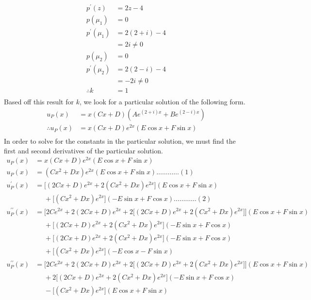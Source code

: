 \documentclass[a4paper]{article}
\newcommand{\ds}{\displaystyle}
\begin{document}
\begin{enumerate}
\begin{align*}
		p^{\prime}(z) & = 2z - 4\\
		p(\mu_1) & = 0\\
		p^{\prime}(\mu_1) & = 2(2+i) - 4\\
		& = 2i \neq 0\\
		p(\mu_2) & = 0\\
		p^{\prime}(\mu_2) & = 2(2-i) - 4\\
		& = -2i \neq 0\\
		\therefore k & = 1\\
	\end{align*}
	Based off this result for $\ds{k}$, we look for a particular solution of the following form.
	\begin{align*}
		u_P(x) & = x(Cx + D)(Ae^{(2+i)x} + Be^{(2-i)x})\\
		\therefore u_P(x) & = x(Cx + D)e^{2x}(E\cos{x} + F\sin{x})\\
	\end{align*}
	In order to solve for the constants in the particular solution, we must find the first and second derivatives of the particular solution.
	\begin{align*}
		u_P(x) & = x(Cx + D)e^{2x}(E\cos{x} + F\sin{x})\\
		u_P(x) & = (Cx^2 + Dx)e^{2x}(E\cos{x} + F\sin{x})\dots\dots\dots\dots(1)\\
		u_P^{\prime}(x) & = \Big[(2Cx + D)e^{2x} + 2(Cx^2 + Dx)e^{2x} \Big](E\cos{x} + F\sin{x})\\ 
		& \phantom{{}={}} + \Big[(Cx^2 + Dx)e^{2x} \Big](-E\sin{x} + F\cos{x})\dots\dots\dots\dots(2)\\
		u_P^{\prime\prime}(x) & = \Big[2Ce^{2x} + 2(2Cx+D)e^{2x} +2\big[(2Cx+D)e^{2x} + 2(Cx^2+Dx)e^{2x}\big] \Big](E\cos{x} + F\sin{x})\\
		& \phantom{{}={}} + \Big[(2Cx+D)e^{2x} + 2(Cx^2+Dx)e^{2x} \Big](-E\sin{x} + F\cos{x})\\
		& \phantom{{}={}} + \Big[(2Cx+D)e^{2x} + 2(Cx^2+Dx)e^{2x} \Big](-E\sin{x} + F\cos{x})\\
		& \phantom{{}={}} + \Big[(Cx^2+Dx)e^{2x} \Big](-E\cos{x} - F\sin{x})\\
		u_P^{\prime\prime}(x) & = \Big[2Ce^{2x} + 2(2Cx+D)e^{2x} +2\big[(2Cx+D)e^{2x} + 2(Cx^2+Dx)e^{2x}\big] \Big](E\cos{x} + F\sin{x})\\
		& \phantom{{}={}} + 2\Big[(2Cx+D)e^{2x} + 2(Cx^2+Dx)e^{2x} \Big](-E\sin{x} + F\cos{x})\\
		& \phantom{{}={}} - \Big[(Cx^2+Dx)e^{2x} \Big](E\cos{x} + F\sin{x})\\

\end{align*}
\end{enumerate}
\end{document}
